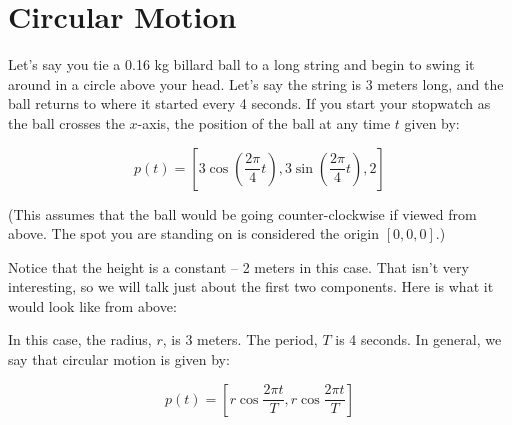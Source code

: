 \chapter{Circular Motion}

Let's say you tie a 0.16 kg billard ball to a long string and begin to swing
it around in a circle above your head. Let's say the string is 3
meters long, and the ball returns to where it started every 4
seconds. If you start your stopwatch as the ball crosses the
$x$-axis, the position of the ball at any time $t$ given by:

$$p(t) = [3 \cos{\left( \frac{2 \pi} {4}t\right)}, 3 \sin{ \left( \frac{2 \pi}{4}t\right) }, 2]$$

(This assumes that the ball would be going counter-clockwise if viewed
from above. The spot you are standing on is considered the origin $[0, 0, 0]$.)

Notice that the height is a constant -- 2 meters in this
case. That isn't very interesting, so we will talk just about the
first two components.  Here is what it would look like from above:


In this case, the radius, $r$, is 3 meters.  The period, $T$ is 4
seconds.  In general, we say that circular motion is given by:

$$p(t) = \left[ r \cos{\frac{2 \pi t}{T}}, r \cos{\frac{2 \pi t}{T}}\right]$$

